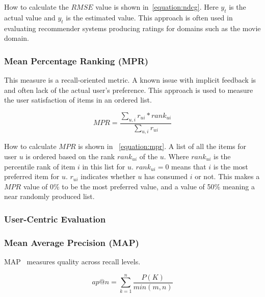 How to calculate the $RMSE$ value is shown in~\ref{equation:ndcg}.
Here $y_t$ is the actual value and $\hat{y_t}$ is the estimated value.
This approach is often used in evaluating recommender systems producing ratings for domains such as the movie domain.


\subsubsection{Mean Percentage Ranking (MPR)}
This measure is a recall-oriented metric.
A known issue with implicit feedback is and often lack of the actual user's preference.
This approach is used to measure the user satisfaction of items in an ordered list.

\begin{equation}
	MPR = \frac{\sum_{u,i}{r_{ui} * rank_{ui}}}{\sum_{u,i}{r_{ui}}}
	\label{equation:mpr}
\end{equation}

How to calculate $MPR$ is shown in ~\ref{equation:mpr}.
A list of all the items for user $u$ is ordered based on the rank $rank_{ui}$ of the $u$.
Where $rank_{ui}$ is the percentile rank of item $i$ in this list for $u$.
$rank_{ui} = 0$ means that $i$ is the most preferred item for $u$.
$r_{ui}$ indicates whether $u$ has consumed $i$ or not.
This makes a $MPR$ value of 0\% to be the most preferred value, and a value of 50\% meaning a near randomly produced list.


\subsubsection{User-Centric Evaluation}
\cite{Pu:2011:UEF:2043932.2043962}


\subsubsection{Mean Average Precision (MAP)}
MAP~\cite{Manning:2008:IIR:1394399} measures quality across recall levels.


\begin{equation}
	ap@n = \sum_{k=1}^{n}{\frac{P(K)}{min(m,n)}}
	\label{equation:apn}
\end{equation}

